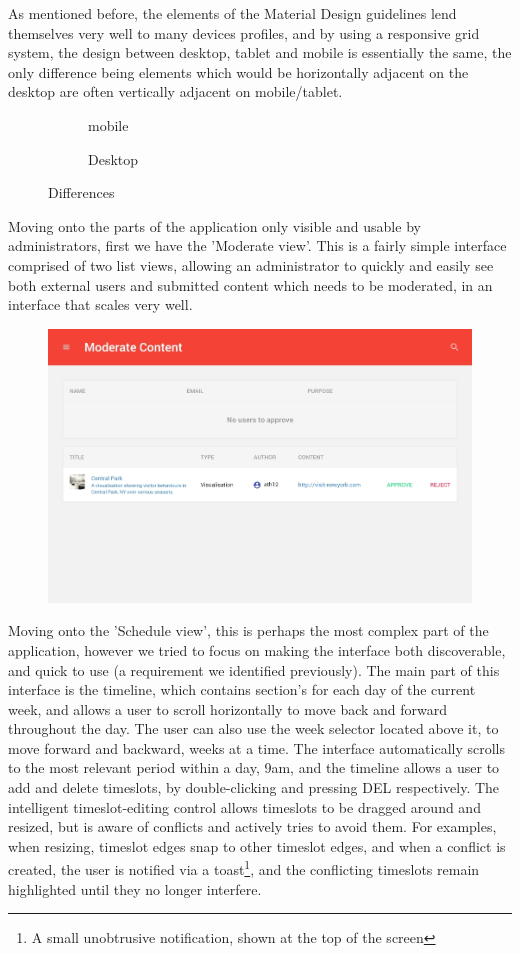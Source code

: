 \documentclass[a4paper, titlepage]{article}
\begin{document}
As mentioned before, the elements of the Material Design guidelines lend themselves very well to many devices profiles, and by using a responsive grid system, the design between desktop, tablet and mobile is essentially the same, the only difference being elements which would be horizontally adjacent on the desktop are often vertically adjacent on mobile/tablet.

\begin{figure}[h!]
\begin{subfigure}{.5\textwidth}
  \centering
  \caption{mobile}

\end{subfigure}
\begin{subfigure}{.5\textwidth}
  \centering
  \caption{Desktop}

\end{subfigure}
\caption{Differences}
\label{fig:intro_WPrender}
\end{figure}

Moving onto the parts of the application only visible and usable by administrators, first we have the 'Moderate view'. This is a fairly simple interface comprised of two list views, allowing an administrator to quickly and easily see both external users and submitted content which needs to be moderated, in an interface that scales very well.


\begin{figure}[h!]
  \centering
  \includegraphics[width=.6\textwidth]{./design/moderate.jpg}
  \label{fig:schedule_screenshot}
\end{figure}

Moving onto the 'Schedule view', this is perhaps the most complex part of the application, however we tried to focus on making the interface both discoverable, and quick to use (a requirement we identified previously). The main part of this interface is the timeline, which contains section's for each day of the current week, and allows a user to scroll horizontally to move back and forward throughout the day. The user can also use the week selector located above it, to move forward and backward, weeks at a time. The interface automatically scrolls to the most relevant period within a day, 9am, and the timeline allows a user to add and delete timeslots, by double-clicking and pressing DEL respectively. The intelligent timeslot-editing control allows timeslots to be dragged around and resized, but is aware of conflicts and actively tries to avoid them. For examples, when resizing, timeslot edges snap to other timeslot edges, and when a conflict is created, the user is notified via a toast\footnote{A small unobtrusive notification, shown at the top of the screen}, and the conflicting timeslots remain highlighted until they no longer interfere.
\end{document}
